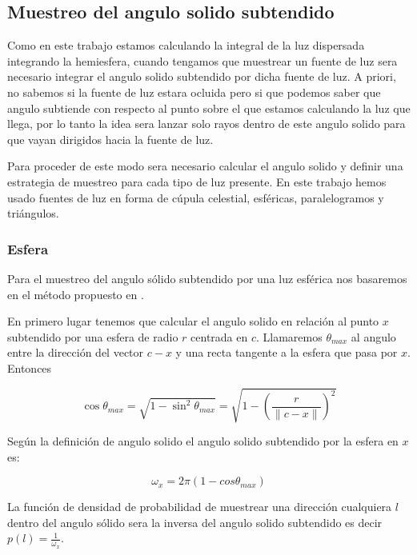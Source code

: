 \subsection{Muestreo del angulo solido subtendido}

Como en este trabajo estamos calculando la integral de la luz dispersada integrando la hemiesfera, cuando tengamos que muestrear un fuente de luz sera necesario integrar el angulo solido subtendido por dicha fuente de luz. A priori, no sabemos si la fuente de luz estara ocluida pero si que podemos saber que angulo subtiende con respecto al punto sobre el que estamos calculando la luz que llega, por lo tanto la idea sera lanzar solo rayos dentro de este angulo solido para que vayan dirigidos hacia la fuente de luz.

\medskip

Para proceder de este modo sera necesario calcular el angulo solido y definir una estrategia de muestreo para cada tipo de luz presente. En este trabajo hemos usado fuentes de luz en forma de cúpula celestial, esféricas, paralelogramos y triángulos.


\subsubsection{Esfera}

Para el muestreo del angulo sólido subtendido por una luz esférica nos basaremos en el método propuesto en \cite{Shirley1996}.

\medskip

En primero lugar tenemos que calcular el angulo solido en relación al punto $x$ subtendido por una esfera de radio $r$ centrada en $c$. Llamaremos $\theta_{max}$ al angulo entre la dirección del vector $c - x$ y una recta tangente a la esfera que pasa por $x$. Entonces

\begin{equation}
\cos \theta_{max} = \sqrt{1 - \sin^2 \theta_{max}} = \sqrt{ 1 - \left(\frac{r}{\lVert c - x \rVert} \right)^2 }
\end{equation}

Según la definición de angulo solido el angulo solido subtendido por la esfera en $x$ es:

\begin{equation}
\omega_x = 2\pi (1 - cos \theta_{max})
\end{equation}

La función de densidad de probabilidad de muestrear una dirección cualquiera $l$ dentro del angulo sólido sera la inversa del angulo solido subtendido es decir $p(l) = \frac{1}{\omega_x}$.

